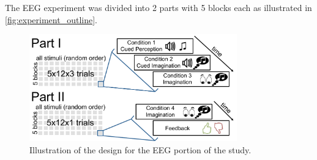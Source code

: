 The EEG experiment was divided into 2 parts with 5 blocks each as illustrated in \autoref{fig:experiment_outline}.
\begin{figure}
  \begin{center}
    \includegraphics[width=0.8\textwidth,keepaspectratio=true]{Figures/study_design_small.pdf}
    \caption{%
Illustration of the design for the EEG portion of the study.
}
    \label{fig:experiment_outline}
  \end{center}
\end{figure}

